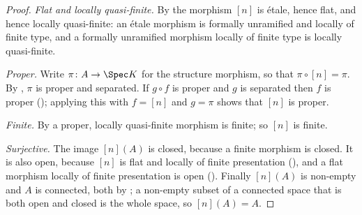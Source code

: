 \begin{proof}
\leanok
\emph{Flat and locally quasi-finite.}  By  the
morphism $[n]$ is \'etale, hence flat, and hence locally quasi-finite: an
\'etale morphism is formally unramified and locally of finite type, and a
formally unramified morphism locally of finite type is locally quasi-finite.

\emph{Proper.}  Write $\pi\colon A\to\Spec K$ for the structure morphism, so
that $\pi\circ[n]=\pi$.  By , $\pi$ is proper and
separated.  If $g\circ f$ is proper and $g$ is separated then $f$ is proper
(); applying this with $f=[n]$ and $g=\pi$ shows that $[n]$
is proper.

\emph{Finite.}  By  a proper, locally quasi-finite
morphism is finite; so $[n]$ is finite.

\emph{Surjective.}  The image $[n](A)$ is closed, because a finite morphism is
closed.  It is also open, because $[n]$ is flat and locally of finite
presentation (), and a flat morphism locally of finite
presentation is open ().  Finally $[n](A)$ is non-empty and
$A$ is connected, both by ; a non-empty subset of a
connected space that is both open and closed is the whole space, so
$[n](A)=A$.
\end{proof}

